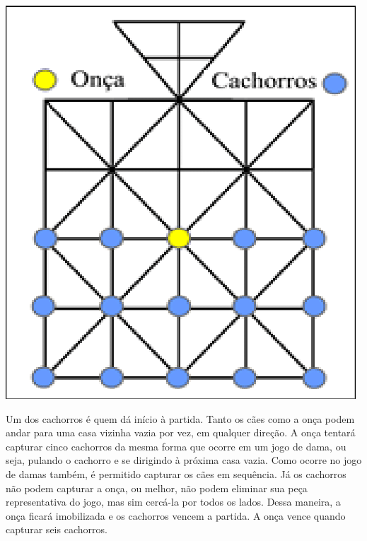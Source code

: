 \begin{minipage}{.5\textwidth}
\includegraphics[width=\textwidth]{./imgs/art26.png}
\end{minipage}\hspace{.5cm}
\begin{minipage}{.5\textwidth}
Um dos cachorros é quem dá início à partida. Tanto os cães como a onça
podem andar para uma casa vizinha vazia por vez, em qualquer direção. A
onça tentará capturar cinco cachorros da mesma forma que ocorre em um
jogo de dama, ou seja, pulando o cachorro e se dirigindo à próxima casa
vazia. Como ocorre no jogo de damas também, é permitido capturar os
cães em sequência. Já os cachorros não podem capturar a onça, ou melhor,
não podem eliminar sua peça representativa do jogo, mas sim cercá-la por
todos os lados. Dessa maneira, a onça ficará imobilizada e os cachorros
vencem a partida. A onça vence quando capturar seis cachorros.
\end{minipage}



